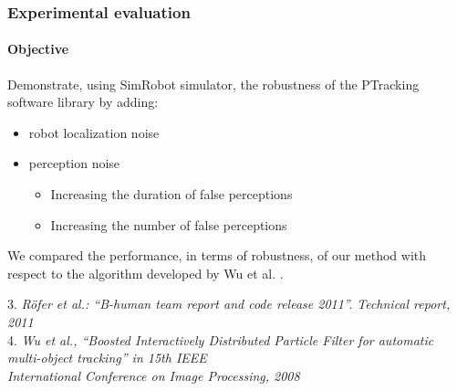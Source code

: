\begin{frame}
	\frametitle{Experimental evaluation}
	\framesubtitle{Objective}
	
	\vspace{0.5cm}
	
	Demonstrate, using SimRobot \cite{BHuman11} simulator, the robustness of the PTracking software library by
	adding:
	
	\vspace{0.25cm}
	
	\begin{itemize}
		\item robot localization noise
		\item perception noise
			  \begin{itemize}
			  	\item Increasing the duration of false perceptions
				\item Increasing the number of false perceptions
			  \end{itemize}
	\end{itemize}
	
	\vspace{0.25cm}
	
	We compared the performance, in terms of robustness, of our method with respect to the algorithm developed by Wu
	et al. \cite{Wu08}.
	
	\vspace{1cm}

	\tiny 3. \emph{R\"{o}fer et al.: ``B-human team report and code release 2011''. Technical report, 2011} \\
	\vspace{0.1cm}
	\tiny 4. \emph{Wu et al., ``Boosted Interactively Distributed Particle Filter for automatic multi-object tracking'' in 15th IEEE} \\
	\vspace{-0.18cm}
	\tiny \emph{International Conference on Image Processing, 2008}
\end{frame}

